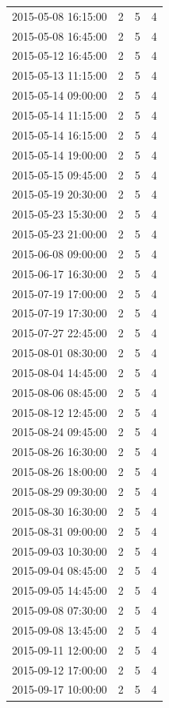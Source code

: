 \begin{tabular}{lrrr}
2015-05-08 16:15:00 & 2 & 5 & 4 \\
2015-05-08 16:45:00 & 2 & 5 & 4 \\
2015-05-12 16:45:00 & 2 & 5 & 4 \\
2015-05-13 11:15:00 & 2 & 5 & 4 \\
2015-05-14 09:00:00 & 2 & 5 & 4 \\
2015-05-14 11:15:00 & 2 & 5 & 4 \\
2015-05-14 16:15:00 & 2 & 5 & 4 \\
2015-05-14 19:00:00 & 2 & 5 & 4 \\
2015-05-15 09:45:00 & 2 & 5 & 4 \\
2015-05-19 20:30:00 & 2 & 5 & 4 \\
2015-05-23 15:30:00 & 2 & 5 & 4 \\
2015-05-23 21:00:00 & 2 & 5 & 4 \\
2015-06-08 09:00:00 & 2 & 5 & 4 \\
2015-06-17 16:30:00 & 2 & 5 & 4 \\
2015-07-19 17:00:00 & 2 & 5 & 4 \\
2015-07-19 17:30:00 & 2 & 5 & 4 \\
2015-07-27 22:45:00 & 2 & 5 & 4 \\
2015-08-01 08:30:00 & 2 & 5 & 4 \\
2015-08-04 14:45:00 & 2 & 5 & 4 \\
2015-08-06 08:45:00 & 2 & 5 & 4 \\
2015-08-12 12:45:00 & 2 & 5 & 4 \\
2015-08-24 09:45:00 & 2 & 5 & 4 \\
2015-08-26 16:30:00 & 2 & 5 & 4 \\
2015-08-26 18:00:00 & 2 & 5 & 4 \\
2015-08-29 09:30:00 & 2 & 5 & 4 \\
2015-08-30 16:30:00 & 2 & 5 & 4 \\
2015-08-31 09:00:00 & 2 & 5 & 4 \\
2015-09-03 10:30:00 & 2 & 5 & 4 \\
2015-09-04 08:45:00 & 2 & 5 & 4 \\
2015-09-05 14:45:00 & 2 & 5 & 4 \\
2015-09-08 07:30:00 & 2 & 5 & 4 \\
2015-09-08 13:45:00 & 2 & 5 & 4 \\
2015-09-11 12:00:00 & 2 & 5 & 4 \\
2015-09-12 17:00:00 & 2 & 5 & 4 \\
2015-09-17 10:00:00 & 2 & 5 & 4 \\

\end{tabular}
